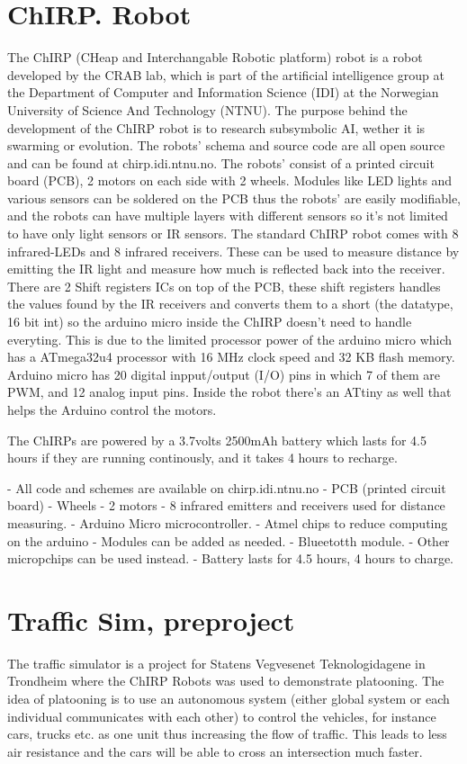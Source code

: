 \section{ChIRP. Robot}
The ChIRP (CHeap and Interchangable Robotic platform) robot is a robot developed by the CRAB lab, which is part of the artificial intelligence group at the Department of Computer and Information Science (IDI) at the Norwegian University of Science And Technology (NTNU).
The purpose behind the development of the ChIRP robot is to research subsymbolic AI, wether it is swarming or evolution.
The robots' schema and source code are all open source and can be found at chirp.idi.ntnu.no. The robots' consist of a printed circuit board (PCB), 2 motors on each side with 2 wheels.
Modules like LED lights and various sensors can be soldered on the PCB thus the robots' are easily modifiable, and the robots can have multiple layers with different sensors so it's not limited to have only light sensors or IR sensors. The standard ChIRP robot comes with 8 infrared-LEDs and 8 infrared receivers. These can be used to measure distance by emitting the IR light and measure how much is reflected back into the receiver. There are 2 Shift registers ICs on top of the PCB, these shift registers handles the values found by the IR receivers and converts them to a short (the datatype, 16 bit int) so the arduino micro inside the ChIRP doesn't need to handle everyting. This is due to the limited processor power of the arduino micro which has a ATmega32u4 processor with 16 MHz clock speed and 32 KB flash memory. Arduino micro has 20 digital inpput/output (I/O) pins in which 7 of them are PWM, and 12 analog input pins. Inside the robot there's an ATtiny as well that helps the Arduino control the motors.

The ChIRPs are powered by a 3.7volts 2500mAh battery which lasts for 4.5 hours if they are running continously, and it takes 4 hours to recharge.

- All code and schemes are available on chirp.idi.ntnu.no
- PCB (printed circuit board)
- Wheels
- 2 motors
- 8 infrared emitters and receivers used for distance measuring.
- Arduino Micro microcontroller.
- Atmel chips to reduce computing on the arduino
- Modules can be added as needed.
- Blueetotth module.
- Other micropchips can be used instead.
- Battery lasts for 4.5 hours, 4 hours to charge.


\section{Traffic Sim, preproject}
The traffic simulator is a project for Statens Vegvesenet Teknologidagene in Trondheim where the ChIRP Robots was used to demonstrate platooning. 
The idea of platooning is to use an autonomous system (either global system or each individual communicates with each other) to control the vehicles, for instance cars, trucks etc. as one unit thus increasing the flow of traffic.
This leads to less air resistance and the cars will be able to cross an intersection much faster.

